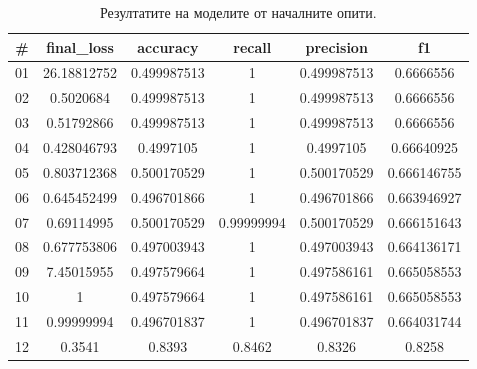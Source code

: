 \documentclass{article}
\begin{document}
\begin{table}[H]
\centering
\captionsetup{justification=centering}
\begin{tabular}{|c||c|c|c|c|c|}
\hline
\# & final\_loss & accuracy & recall & precision & f1\\
\hline
01 & 26.18812752 & 0.499987513 & 1 & 0.499987513 & 0.6666556\\
02 & 0.5020684 & 0.499987513 & 1 & 0.499987513 & 0.6666556\\
03 & 0.51792866 & 0.499987513 & 1 & 0.499987513 & 0.6666556\\
04 & 0.428046793 & 0.4997105 & 1 & 0.4997105 & 0.66640925\\
05 & 0.803712368 & 0.500170529 & 1 & 0.500170529 & 0.666146755\\
06 & 0.645452499 & 0.496701866 & 1 & 0.496701866 & 0.663946927\\
07 & 0.69114995 & 0.500170529 & 0.99999994 & 0.500170529 & 0.666151643\\
08 & 0.677753806 & 0.497003943 & 1 & 0.497003943 & 0.664136171\\
09 & 7.45015955 & 0.497579664 & 1 & 0.497586161 & 0.665058553\\
10 & 1 & 0.497579664 & 1 & 0.497586161 & 0.665058553\\
11 & 0.99999994 & 0.496701837 & 1 & 0.496701837 & 0.664031744\\
12 & 0.3541 & 0.8393 & 0.8462 & 0.8326 & 0.8258\\
\hline
\end{tabular}
\caption{Резултатите на моделите от началните опити.}
\end{table}
\end{document}
